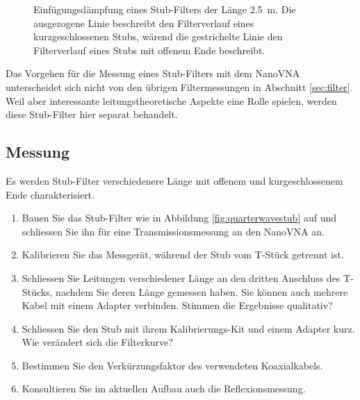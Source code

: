 \documentclass[twoside,a4paper,11pt,halfparskip,DIV=11,notitlepage]{scrartcl}
\begin{document}
\begin{figure}[H]
\begin{center}
\end{center}
\caption{Einfügungsdämpfung eines Stub-Filters der Länge 2.5~m. Die ausgezogene Linie beschreibt den Filterverlauf
eines kurzgeschlossenen Stubs, wärend die gestrichelte Linie den Filterverlauf eines Stubs mit offenem Ende beschreibt.}
\label{fig:wuarterwaveplot}
\end{figure}

Das Vorgehen für die Messung eines Stub-Filters mit dem NanoVNA unterscheidet
sich nicht von den übrigen Filtermessungen in Abschnitt \ref{sec:filter}. Weil
aber interessante leitungstheoretische Aspekte eine Rolle spielen, werden diese
Stub-Filter hier separat behandelt.

\subsection{Messung}

Es werden Stub-Filter verschiedenere Länge mit offenem und kurgeschlossenem Ende charakterisiert.

\begin{enumerate}
    \item Bauen Sie das Stub-Filter wie in Abbildung \ref{fig:quarterwavestub} auf und schliessen Sie ihn für eine
        Transmissionsmessung an den NanoVNA an.
    \item Kalibrieren Sie das Messgerät, während der Stub vom T-Stück getrennt ist.
    \item Schliessen Sie Leitungen verschiedener Länge an den dritten Anschluss des T-Stücks, nachdem Sie deren
        Länge gemessen haben. Sie können auch mehrere Kabel mit einem Adapter verbinden. Stimmen die Ergebnisse qualitativ?
    \item Schliessen Sie den Stub mit ihrem Kalibrierungs-Kit und einem Adapter kurz. Wie verändert sich die Filterkurve?
    \item Bestimmen Sie den Verkürzungsfaktor des verwendeten Koaxialkabels.
    \item Konsultieren Sie im aktuellen Aufbau auch die Reflexionsmessung.
\end{enumerate}
\end{document}
